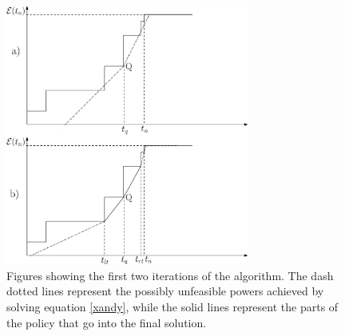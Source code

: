 \begin{figure}
\label{theorem1}
\centering
  \centerline{\includegraphics[width=8cm]{theorem1.eps}}
\caption{Figures showing the first two iterations of the algorithm. The dash dotted lines represent the possibly unfeasible powers achieved by solving equation \eqref{xandy}, while the solid lines represent the parts of the policy that go into the final solution.}
\end{figure}


